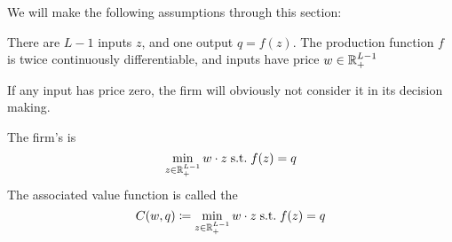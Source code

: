 \documentclass[12pt]{article}
\begin{document}
We will make the following assumptions through this section:

\begin{assumption}
	There are $L-1$ inputs $z$, and one output $q = f(z)$. The production function $f$ is twice continuously differentiable, and inputs have price $w \in \mathbb{R}^{L-1}_+$
\end{assumption}
\begin{remark}
	If any input has price zero, the firm will obviously not consider it in its decision making.
\end{remark}

\begin{definition}
	The firm's  is
	\[
	\min_{z \in \mathbb{R}^{L-1}_+} w \cdot z \;\text{s.t.}\; f(z) = q
	\]
	The associated value function is called the 
	\[
	C(w,q) \coloneqq \min_{z \in \mathbb{R}^{L-1}_+} w \cdot z \;\text{s.t.}\; f(z) = q
	\]
\end{definition}
\end{document}
